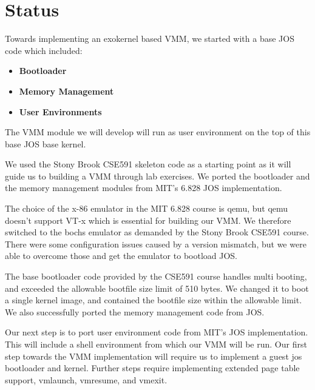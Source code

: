 \section {Status}

Towards implementing an exokernel based VMM, we started with a base JOS code which included:
\begin{itemize}
\item \textbf{Bootloader}
\item \textbf{Memory Management}
\item \textbf{User Environments}
\end{itemize}

The VMM module we will develop will run as user environment on the top of this base JOS base kernel.

We used the Stony Brook CSE591 \cite {cse591} skeleton code as a starting point as it will guide us to building a VMM through lab exercises. We ported the bootloader and the memory management modules from MIT's 6.828 \cite{6.828} JOS implementation.

The choice of the x-86 emulator in the MIT 6.828 course is qemu, but qemu doesn't support VT-x which is essential for building our VMM. We therefore switched to the bochs emulator as demanded by the Stony Brook CSE591 course. There were some configuration issues caused by a version mismatch, but we were able to overcome those and get the emulator to bootload JOS.

The base bootloader code provided by the CSE591 course handles multi booting, and exceeded the allowable bootfile size limit of 510 bytes. We changed it to boot a single kernel image, and contained the bootfile size within the allowable limit. We also successfully ported the memory management code from JOS.

Our next step is to port user environment code from MIT's JOS implementation. This will include a shell environment from which our VMM will be run. Our first step towards the VMM implementation will require us to implement a guest jos bootloader and kernel. Further steps require implementing extended page table support, vmlaunch, vmresume, and vmexit.

